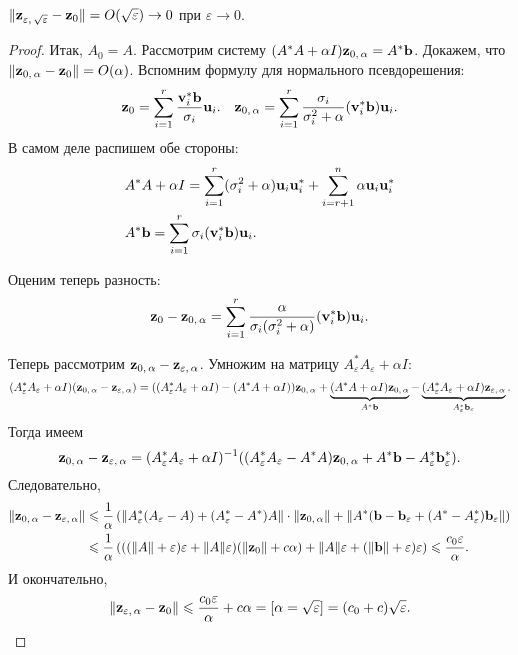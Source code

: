 \begin{theorem}
    $\|\mathbf{z}_{\varepsilon,\, \sqrt{\varepsilon}}-\mathbf{z}_0\|=O(\sqrt{\varepsilon})\to 0$ при $\varepsilon\to 0$.
    
    \begin{proof}
        
        Итак, $A_0=A$. Рассмотрим систему $(A^*A+\alpha I)\mathbf{z}_{0,\, \alpha}=A^*\mathbf{b}$.
        Докажем, что $\|\mathbf{z}_{0,\,\alpha}-\mathbf{z}_0\|=O(\alpha)$. Вспомним формулу для нормального псевдорешения:
        \[
            \mathbf{z}_0=\sum_{i=1}^r\dfrac{\mathbf{v}_i^*\mathbf{b}}{\sigma_i}\mathbf{u}_i.\quad \mathbf{z}_{0,\,\alpha}=
            \sum_{i=1}^r\dfrac{\sigma_i}{\sigma_i^2+\alpha}(\mathbf{v}_i^*\mathbf{b})\mathbf{u}_i.
        \]
        В самом деле распишем обе стороны:
        \begin{align*}
            &A^*A+\alpha I=\sum_{i=1}^r(\sigma_i^2+\alpha)\mathbf{u}_i\mathbf{u}_i^*+\sum_{i=r+1}^n \alpha\mathbf{u}_i\mathbf{u}_i^*\\
            &A^*\mathbf{b}=\sum_{i=1}^r \sigma_i(\mathbf{v}_i^*\mathbf{b})\mathbf{u}_i.
        \end{align*}

        Оценим теперь разность: 
        \[
            \mathbf{z}_0-\mathbf{z}_{0,\,\alpha}=\sum_{i=1}^r\dfrac{\alpha}{\sigma_i(\sigma_i^2+\alpha)}(\mathbf{v}_i^*\mathbf{b})\mathbf{u}_i.
        \]

        Теперь рассмотрим $\mathbf{z}_{0,\,\alpha}-\mathbf{z}_{\varepsilon,\, \alpha}$. Умножим на матрицу $A^*_{\varepsilon}A_{\varepsilon}+\alpha I$:
        \[
            (A^*_{\varepsilon}A_{\varepsilon}+\alpha I)(\mathbf{z}_{0,\,\alpha}-\mathbf{z}_{\varepsilon,\, \alpha})=((A^*_{\varepsilon}A_{\varepsilon}+\alpha I) -
            (A^*A+\alpha I))\mathbf{z}_{0,\,\alpha}+\underbrace{(A^*A+\alpha I)\mathbf{z}_{0,\,\alpha}}_{A^*\mathbf{b}}-
            \underbrace{(A^*_{\varepsilon}A_{\varepsilon}+\alpha I)\mathbf{z}_{\varepsilon,\,\alpha}}_{A_{\varepsilon}^*\mathbf{b}_{\varepsilon}}.
        \]
        Тогда имеем 
        \[
            \mathbf{z}_{0,\,\alpha}-\mathbf{z}_{\varepsilon,\,\alpha}=(A^*_{\varepsilon}A_{\varepsilon}+\alpha I)^{-1}((A^*_{\varepsilon}A_{\varepsilon}-A^*A)\mathbf{z}_{0,\,\alpha}+
            A^*\mathbf{b}-A_{\varepsilon}^*\mathbf{b}_{\varepsilon}^*).
        \]
        Следовательно,
        \begin{align*}
            \|\mathbf{z}_{0,\,\alpha}-\mathbf{z}_{\varepsilon,\,\alpha}\|&\leqslant \dfrac{1}{\alpha}\left(\|A^*_{\varepsilon}(A_{\varepsilon}-A)+(A^*_{\varepsilon}-A^*)A\|
            \cdot\|\mathbf{z}_{0,\,\alpha}\|+\|A^*(\mathbf{b}-\mathbf{b}_{\varepsilon}+(A^*-A_{\varepsilon}^*)\mathbf{b}_{\varepsilon}\|\right)\\
            &\leqslant\dfrac{1}{\alpha}\left(((\|A\|+\varepsilon)\varepsilon+\|A\|\varepsilon)(\|\mathbf{z}_0\|+c\alpha)+\|A\|\varepsilon+(\|\mathbf{b}\|+\varepsilon)\varepsilon\right)
            \leqslant\dfrac{c_0\varepsilon}{\alpha}. 
        \end{align*}
        И окончательно,
        \[
            \|\mathbf{z}_{\varepsilon,\,\alpha}-\mathbf{z}_0\|\leqslant \dfrac{c_0\varepsilon}{\alpha}+c\alpha=[\alpha = \sqrt{\varepsilon}]=(c_0+c)\sqrt{\varepsilon}.    
        \]
    \end{proof} 
\end{theorem}